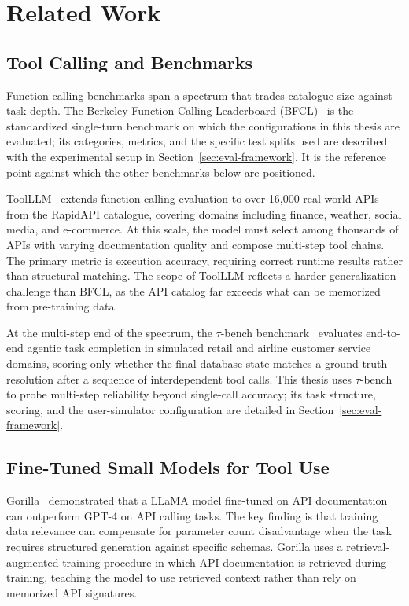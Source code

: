 \section{Related Work}

\subsection{Tool Calling and Benchmarks}

Function-calling benchmarks span a spectrum that trades catalogue
size against task depth. The Berkeley Function Calling Leaderboard
(BFCL)~\cite{bfcl2024} is the standardized single-turn benchmark on
which the configurations in this thesis are evaluated; its categories,
metrics, and the specific test splits used are described with the
experimental setup in Section~\ref{sec:eval-framework}. It is the
reference point against which the other benchmarks below are
positioned.

ToolLLM~\cite{qin2024toolllm} extends function-calling evaluation to
over 16,000 real-world APIs from the RapidAPI catalogue, covering
domains including finance, weather, social media, and e-commerce. At
this scale, the model must select among thousands of APIs with
varying documentation quality and compose multi-step tool chains. The
primary metric is execution accuracy, requiring correct runtime
results rather than structural matching. The scope of ToolLLM
reflects a harder generalization challenge than BFCL, as the API
catalog far exceeds what can be memorized from pre-training data.

At the multi-step end of the spectrum, the $\tau$-bench
benchmark~\cite{taubench2024} evaluates end-to-end agentic task
completion in simulated retail and airline customer service domains,
scoring only whether the final database state matches a ground truth
resolution after a sequence of interdependent tool calls. This thesis
uses $\tau$-bench to probe multi-step reliability beyond single-call
accuracy; its task structure, scoring, and the user-simulator
configuration are detailed in Section~\ref{sec:eval-framework}.

\subsection{Fine-Tuned Small Models for Tool Use}

Gorilla~\cite{patil2023gorilla} demonstrated that a LLaMA model
fine-tuned on API documentation can outperform GPT-4 on API calling
tasks. The key finding is that training data relevance can compensate
for parameter count disadvantage when the task requires structured
generation against specific schemas. Gorilla uses a
retrieval-augmented training procedure in which API documentation is
retrieved during training, teaching the model to use retrieved
context rather than rely on memorized API signatures.

